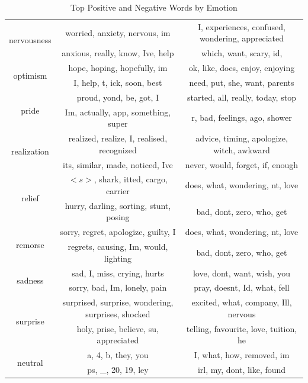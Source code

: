 \documentclass[conference,compsoc]{IEEEtran}
\begin{document}
\begin{table}[ht]
\begin{tabular}{|c|c|c|}
\hline
\multirow{2}{*}{nervousness} & worried, anxiety, nervous, im & I, experiences, confused, wondering, appreciated \\
& anxious, really, know, Ive, help & which, want, scary, id, \\
\hline
\multirow{2}{*}{optimism} & hope, hoping, hopefully, im & ok, like, does, enjoy, enjoying \\
& I, help, t, ick, soon, best & need, put, she, want, parents \\
\hline
\multirow{2}{*}{pride} & proud, yond, be, got, I & started, all, really, today, stop \\
& Im, actually, app, something, super & r, bad, feelings, ago, shower \\
\hline
\multirow{2}{*}{realization} & realized, realize, I, realised, recognized & advice, timing, apologize, witch, awkward \\
& its, similar, made, noticed, Ive & never, would, forget, if, enough \\
\hline
\multirow{2}{*}{relief} & $<s>$, shark, itted, cargo, carrier & does, what, wondering, nt, love \\
& hurry, darling, sorting, stunt, posing & bad, dont, zero, who, get \\
\hline
\multirow{2}{*}{remorse} & sorry, regret, apologize, guilty, I & does, what, wondering, nt, love \\
& regrets, causing, Im, would, lighting & bad, dont, zero, who, get \\
\hline
\multirow{2}{*}{sadness} & sad, I, miss, crying, hurts & love, dont, want, wish, you \\
& sorry, bad, Im, lonely, pain & pray, doesnt, Id, what, fell \\
\hline
\multirow{2}{*}{surprise} & surprised, surprise, wondering, surprises, shocked & excited, what, company, Ill, nervous \\
& holy, prise, believe, su, appreciated & telling, favourite, love, tuition, he \\
\hline
\multirow{2}{*}{neutral} & a, 4, b, they, you & I, what, how, removed, im \\
& ps, \_, 20, 19, ley & irl, my, dont, like, found \\
\hline
\end{tabular}
\caption{Top Positive and Negative Words by Emotion}
\label{tab:top_words}
\end{table}


\end{document}
